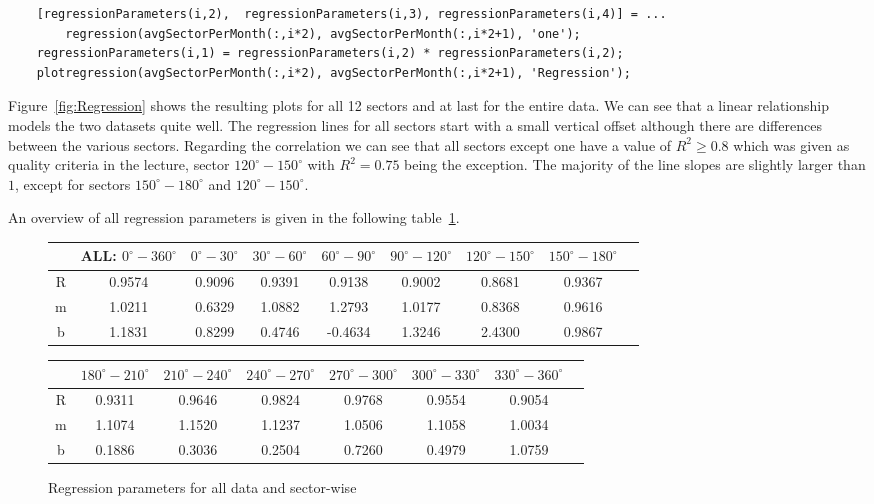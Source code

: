 \documentclass[10pt]{article}
\begin{document}
\begin{lstlisting}
    [regressionParameters(i,2),  regressionParameters(i,3), regressionParameters(i,4)] = ... 
        regression(avgSectorPerMonth(:,i*2), avgSectorPerMonth(:,i*2+1), 'one');
    regressionParameters(i,1) = regressionParameters(i,2) * regressionParameters(i,2);
    plotregression(avgSectorPerMonth(:,i*2), avgSectorPerMonth(:,i*2+1), 'Regression');
\end{lstlisting}
Figure~\ref{fig:Regression} shows the resulting plots for all 12 sectors and at last for the entire data. 
We can see that a linear relationship models the two datasets quite well. The regression lines for all sectors start with a small vertical offset although there are differences between the various sectors. Regarding the correlation we can see that all sectors except one have a value of $R^2 \geq 0.8$ which was given as quality criteria in the lecture, sector $120^{\circ}-150^{\circ}$ with $R^2=0.75$ being the exception. The majority of the line slopes are slightly larger than $1$, except for sectors $150^{\circ}-180^{\circ}$ and $120^{\circ}-150^{\circ}$.

An overview of all regression parameters is given in the following table~\ref{tab:regParam}.

\begin{figure}[H]
\begin{tabular}{c||c|c|c|c|c|c|c|c}

	& ALL:  $0^{\circ}-360^{\circ}$ &  $0^{\circ}-30^{\circ}$ & $30^{\circ}-60^{\circ}$ & $60^{\circ}-90^{\circ}$ & $90^{\circ}-120^{\circ}$ & $120^{\circ}-150^{\circ}$ & $150^{\circ}-180^{\circ}$ \\
	\hline \hline
    R & 0.9574 &   0.9096 &   0.9391  &  0.9138  &  0.9002  &  0.8681  &  0.9367  &  \\
    \hline
    m & 1.0211 &   0.6329 &   1.0882  &  1.2793  &  1.0177  &  0.8368  &  0.9616  &   \\
    \hline
    b & 1.1831 &   0.8299 &   0.4746  & -0.4634  &  1.3246  &  2.4300  &  0.9867  &  \\

\end{tabular}

\vspace{30 pt}

\begin{tabular}{c||c|c|c|c|c|c|c}

	& $180^{\circ}-210^{\circ}$ & $210^{\circ}-240^{\circ}$ & $240^{\circ}-270^{\circ}$ & $270^{\circ}-300^{\circ}$ & $300^{\circ}-330^{\circ}$ & $330^{\circ}-360^{\circ}$ \\
	\hline \hline
    R   &  0.9311  &  0.9646  &  0.9824  &  0.9768  &  0.9554  &  0.9054 & \\
    \hline
    m &  1.1074  &  1.1520  &  1.1237 &   1.0506 &   1.1058  &  1.0034 & \\
    \hline
    b   &  0.1886  &  0.3036  &  0.2504 &   0.7260  &  0.4979  &  1.0759& \\

\end{tabular}
\caption{Regression parameters for all data and sector-wise}
\label{tab:regParam}
\end{figure}
\end{document}
